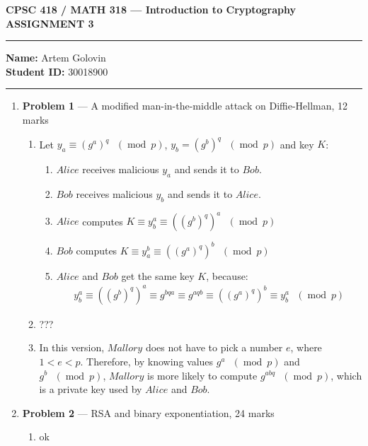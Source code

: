 \documentclass[11pt]{article}
\theoremstyle{definition}
\renewcommand{\pmod}[1]{\mbox{\ $(\ensuremath{\operatorname{mod}}\ {#1})$}}
\newcommand{\A}{Alice}
\newcommand{\B}{Bob}
\newcommand{\M}{Mallory}
\begin{document}
\begin{center}
  \bf \Large CPSC 418 / MATH 318 --- Introduction to Cryptography \\
  ASSIGNMENT 3
\end{center}

\medskip \hrule
  \textbf{Name:} Artem Golovin \\
  \textbf{Student ID:} 30018900
\medskip \hrule


\begin{enumerate} \itemsep 0.3in

\item[] \textbf{Problem 1} --- A modified man-in-the-middle attack on Diffie-Hellman, 12 marks

\begin{enumerate}
  \item
    Let $y_a \equiv (g^a)^q \pmod{p}$, $y_b = (g^b)^q \pmod{p}$ and key $K$:
    \begin{enumerate}
      \item $\A$ receives malicious $y_a$ and sends it to $\B$.
      \item $\B$ receives malicious $y_b$ and sends it to $\A$.
      \item $\A$ computes $K \equiv y_b^a \equiv ((g^b)^q)^a \pmod{p}$
      \item $\B$ computes $K \equiv y_a^b \equiv ((g^a)^q)^b \pmod{p}$
      \item $\A$ and $\B$ get the same key $K$, because:
        \begin{align*}
          y_b^a \equiv ((g^b)^q)^a \equiv g^{bqa} \equiv g^{aqb} \equiv ((g^a)^q)^b \equiv y_b^a \pmod{p}
        \end{align*}
    \end{enumerate}
  \item ???
  \item 
    In this version, $\M$ does not have to pick a number $e$, where $1 < e < p$. Therefore, by knowing values $g^a \pmod{p}$ and $g^b \pmod{p}$, $\M$ is more likely to compute $g^{abq} \pmod{p}$, which is a private key used by $\A$ and $\B$.
\end{enumerate}

\newpage

\item[] \textbf{Problem 2} --- RSA and binary exponentiation, 24 marks

\begin{enumerate}
  \item ok
\end{enumerate}


\end{enumerate}
\end{document}
